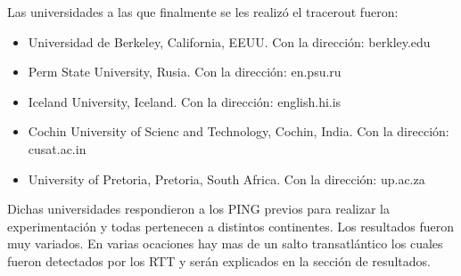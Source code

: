 Las universidades a las que finalmente se les realizó el tracerout fueron:

\begin{itemize}
	\item Universidad de Berkeley, California, EEUU. Con la dirección: berkley.edu
	\item Perm State University, Rusia. Con la dirección: en.psu.ru
	\item Iceland University, Iceland. Con la dirección: english.hi.is
	\item Cochin University of Scienc and Technology, Cochin, India. Con la dirección: cusat.ac.in
	\item University of Pretoria, Pretoria, South Africa. Con la dirección: up.ac.za 
\end{itemize}

Dichas universidades respondieron a los PING previos para realizar la experimentación y todas pertenecen a distintos continentes. Los resultados fueron muy variados. En varias ocaciones hay mas de un salto transatlántico los cuales fueron detectados por los RTT y serán explicados en la sección de resultados.